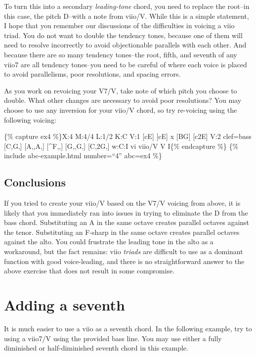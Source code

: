 \documentclass{book}
\begin{document}
To turn this into a secondary \emph{leading-tone} chord, you need to replace
the root--in this case, the pitch D--with a note from viio/V. While this is a
simple statement, I hope that you remember our discussions of the difficulties
in voicing a viio triad. You do not want to double the tendency tones, because
one of them will need to resolve incorrectly to avoid objectionable parallels
with each other. And because there are so many tendency tones--the root,
fifth, and seventh of any viio7 are all tendency tones--you need to be careful
of where each voice is placed to avoid parallelisms, poor resolutions, and
spacing errors.

As you work on revoicing your V7/V, take note of which pitch you choose to
double. What other changes are necessary to avoid poor resolutions? You may
choose to use any inversion for your viio/V chord, so try re-voicing using the
following voicing:

\{\% capture ex4 \%\}X:4 M:4/4 L:1/2 K:C V:1 {[}cE{]} {[}cE{]}\textbar{} x
{[}BG{]}\textbar{} {[}c2E{]}\textbar{]} V:2 clef=bass {[}C,G,{]}
{[}A,,A,{]}\textbar{} {[}\^{}F,,{]} {[}G,,G,{]}\textbar{}
{[}C,2G,{]}\textbar{]} w:C:I vi viio/V V I\{\% endcapture \%\} \{\% include
abc-example.html number=``4'' abc=ex4 \%\}

\hypertarget{conclusions-34}{%
\subsection{Conclusions}\label{conclusions-34}}

If you tried to create your viio/V based on the V7/V voicing from above, it is
likely that you immediately ran into issues in trying to eliminate the D from
the bass chord. Substituting an A in the same octave creates parallel octaves
against the tenor. Substituting an F-sharp in the same octave creates parallel
octaves against the alto. You could frustrate the leading tone in the alto as
a workaround, but the fact remains: viio \emph{triads} are difficult to use as
a dominant function with good voice-leading, and there is no straightforward
answer to the above exercise that does not result in some compromise.

\hypertarget{adding-a-seventh}{%
\section{Adding a seventh}\label{adding-a-seventh}}

It is much easier to use a viio as a seventh chord. In the following example,
try to using a viio7/V using the provided bass line. You may use either a
fully diminished or half-diminished seventh chord in this example.
\end{document}
